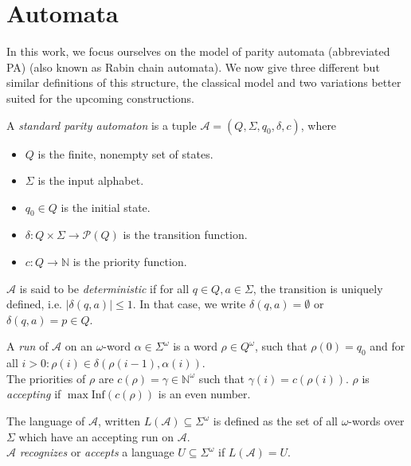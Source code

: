 
\section{Automata}
In this work, we focus ourselves on the model of parity automata (abbreviated PA) (also known as Rabin chain automata). We now give three different but similar definitions of this structure, the classical model and two variations better suited for the upcoming constructions. 


\begin{defn}
	A \emph{standard parity automaton} is a tuple $\mathcal{A} = (Q, \Sigma, q_0, \delta, c)$, where
	\begin{itemize}
		\item $Q$ is the finite, nonempty set of states.
		\item $\Sigma$ is the input alphabet.
		\item $q_0 \in Q$ is the initial state.
		\item $\delta : Q \times \Sigma \rightarrow \mathcal{P}(Q)$ is the transition function.
		\item $c : Q \rightarrow \mathbb{N}$ is the priority function.
	\end{itemize}
	$\mathcal{A}$ is said to be \emph{deterministic} if for all $q \in Q, a \in \Sigma$, the transition is uniquely defined, i.e. $|\delta(q, a)| \leq 1$. In that case, we write $\delta(q, a) = \emptyset$ or $\delta(q, a) = p \in Q$.
	
	A \emph{run} of $\mathcal{A}$ on an $\omega$-word $\alpha \in \Sigma^\omega$ is a word $\rho \in Q^\omega$, such that $\rho(0) = q_0$ and for all $i > 0: \rho(i) \in \delta(\rho(i-1), \alpha(i))$. \\
	The priorities of $\rho$ are $c(\rho) = \gamma \in \mathbb{N}^\omega$ such that $\gamma(i) = c(\rho(i))$. $\rho$ is \emph{accepting} if $\max \text{Inf}(c(\rho))$ is an even number.
	
	The language of $\mathcal{A}$, written $L(\mathcal{A}) \subseteq \Sigma^\omega$ is defined as the set of all $\omega$-words over $\Sigma$ which have an accepting run on $\mathcal{A}$. \\
	$\mathcal{A}$ \emph{recognizes} or \emph{accepts} a language $U \subseteq \Sigma^\omega$ if $L(\mathcal{A}) = U$.
\end{defn}


